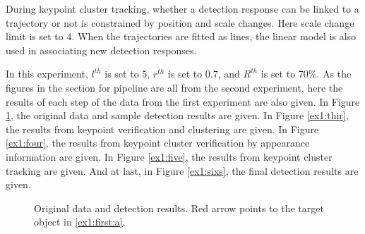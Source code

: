 During keypoint cluster tracking, whether a detection response can be linked to a trajectory or not is constrained by position and scale changes. Here scale change limit is set to 4. When the trajectories are fitted as lines, the linear model is also used in associating new detection responses.


In this experiment, $l^{th}$ is set to 5, $r^{th}$ is set to 0.7, and $R^{th}$ is set to 70\%. As the figures in the section for pipeline are all from the second experiment, here the results of each step of the data from the first experiment are also given. In Figure \ref{ex1:first}, the original data and sample detection results are given. In Figure \ref{ex1:thir}, the results from keypoint verification and clustering are given. In Figure \ref{ex1:four}, the results from keypoint cluster verification by appearance information are given. In Figure \ref{ex1:five}, the results from keypoint cluster tracking are given. And at last, in Figure \ref{ex1:sixs}, the final detection results are given.

\begin{figure}
\centering
{}
\caption[Original data and detection results]{Original data and detection results. Red arrow points to the target object in \ref{ex1:first:a}.}
\label{ex1:first}
\end{figure}


